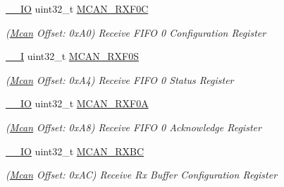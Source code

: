\begin{DoxyCompactItemize}
\mbox{\label{structMcan_a3a402afbdd7214583df6598cf75939a2}} 
\mbox{\hyperlink{core__cm7_8h_aec43007d9998a0a0e01faede4133d6be}{\+\_\+\+\_\+\+IO}} uint32\+\_\+t \mbox{\hyperlink{structMcan_a3a402afbdd7214583df6598cf75939a2}{M\+C\+A\+N\+\_\+\+R\+X\+F0C}}
\begin{DoxyCompactList}\small\item\em (\mbox{\hyperlink{structMcan}{Mcan}} Offset\+: 0x\+A0) Receive F\+I\+FO 0 Configuration Register \end{DoxyCompactList}\item 
\mbox{\label{structMcan_aaf2cc249a2dca37ad5a2f8cccc328b93}} 
\mbox{\hyperlink{core__cm7_8h_af63697ed9952cc71e1225efe205f6cd3}{\+\_\+\+\_\+I}} uint32\+\_\+t \mbox{\hyperlink{structMcan_aaf2cc249a2dca37ad5a2f8cccc328b93}{M\+C\+A\+N\+\_\+\+R\+X\+F0S}}
\begin{DoxyCompactList}\small\item\em (\mbox{\hyperlink{structMcan}{Mcan}} Offset\+: 0x\+A4) Receive F\+I\+FO 0 Status Register \end{DoxyCompactList}\item 
\mbox{\label{structMcan_a2de8e989455d507b0d394861efa3d120}} 
\mbox{\hyperlink{core__cm7_8h_aec43007d9998a0a0e01faede4133d6be}{\+\_\+\+\_\+\+IO}} uint32\+\_\+t \mbox{\hyperlink{structMcan_a2de8e989455d507b0d394861efa3d120}{M\+C\+A\+N\+\_\+\+R\+X\+F0A}}
\begin{DoxyCompactList}\small\item\em (\mbox{\hyperlink{structMcan}{Mcan}} Offset\+: 0x\+A8) Receive F\+I\+FO 0 Acknowledge Register \end{DoxyCompactList}\item 
\mbox{\label{structMcan_a7be495ebe147ded61e71ffab067c2f3c}} 
\mbox{\hyperlink{core__cm7_8h_aec43007d9998a0a0e01faede4133d6be}{\+\_\+\+\_\+\+IO}} uint32\+\_\+t \mbox{\hyperlink{structMcan_a7be495ebe147ded61e71ffab067c2f3c}{M\+C\+A\+N\+\_\+\+R\+X\+BC}}
\begin{DoxyCompactList}\small\item\em (\mbox{\hyperlink{structMcan}{Mcan}} Offset\+: 0x\+AC) Receive Rx Buffer Configuration Register \end{DoxyCompactList}\item 
\mbox{\label{structMcan_ac435d27ad1032489e93e49cdc657b832}} 

\end{DoxyCompactItemize}
